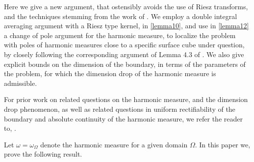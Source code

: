 \documentclass{article}
\newcounter{lem}
\theoremstyle{plain}
\theoremstyle{plain}
\theoremstyle{definition}
\theoremstyle{plain}
\begin{document}
Here we give a new argument, that ostensibly avoids the use of Riesz transforms, and the techniques stemming from the work of \cite{AHMMMTV16, Tol15}. We employ a double integral averaging argument with a Riesz type kernel, in \cref{lemma10}, and use in \cref{lemma12} a change of pole argument for the harmonic measure, to localize the problem with poles of harmonic measures close to a specific surface cube under question, by closely following the corresponding argument of Lemma 4.3 of \cite{Az20}. We also give explicit bounds on the dimension of the boundary, in terms of the parameters of the problem, for which the dimension drop of the harmonic measure is admissible.


  For prior work on related questions on the harmonic measure, and the dimension drop phenomenon, as well as related questions in uniform rectifiability of the boundary and absolute continuity of the harmonic measure, we refer the reader to, \cite{Wol95, Tol15, Pop98, MV86, Mey09, Mattila, Mak85, LVV05, KT99, HMMTZ17, HKM, Harmonic-Measure, Bou87, BE17, AAM16, AHMMMTV16, AMT17, AM15}. 

Let $\omega=\omega_\Omega$ denote the harmonic measure for a given domain $\Omega$. In this paper we, prove the following result.
\end{document}
